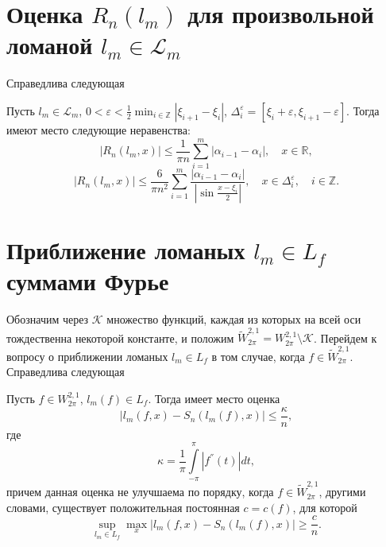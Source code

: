 \section{Оценка $R_n(l_m)$ для произвольной ломаной $l_m \in \mathcal{L}_m$}
Справедлива следующая
\begin{theorem}
Пусть $l_m \in \mathcal{L}_m$, $0 < \varepsilon < \frac{1}{2}\min_{i \in \mathbb{Z}} |\xi_{i+1} - \xi_i|$, $ \Delta_i^\varepsilon = [\xi_i + \varepsilon, \xi_{i+1} - \varepsilon]$. Тогда имеют место следующие неравенства:
\begin{equation}
|R_n(l_m,x)| \leq \frac{1}{\pi n} \sum\limits_{i=1}^{m} |\alpha_{i-1}-\alpha_i|, \quad x \in \mathbb{R}, \label{lm uniform estimate}
\end{equation}
\begin{equation}\label{lm non uniform estimate}
  |R_n(l_m,x)| \leq \frac{6}{\pi n^2} \sum\limits_{i=1}^{m} \frac{|\alpha_{i-1} - \alpha_i|}{\left|\sin \frac{x - \xi_i}{2}\right|}, \quad
  x \in \Delta_i^\varepsilon, \quad i \in \mathbb{Z}.
\end{equation}\label{th1}
\end{theorem}

\section{Приближение ломаных $l_m \in L_f$ суммами Фурье}
Обозначим через $\mathcal{K}$ множество функций, каждая из которых на всей оси тождественна некоторой константе, и положим
$\widetilde{W}_{2\pi}^{2,1} = W_{2\pi}^{2,1} \setminus \mathcal{K}$.
Перейдем к вопросу о приближении ломаных $l_m \in L_f$ в том случае, когда $f \in \widetilde{W}_{2\pi}^{2,1}$. Справедлива следующая
\begin{theorem}
  Пусть $f \in W_{2\pi}^{2,1}$, $l_m(f) \in L_f$. Тогда имеет место оценка
  \begin{equation}
    |l_m(f,x) - S_n(l_m(f),x)| \leq \frac{\kappa}{n},
  \end{equation}
  где
  \begin{equation}
    \kappa = \frac{1}{\pi} \int\limits_{-\pi}^{\pi} |f^{''}(t)|dt,
  \end{equation}
  причем данная оценка не улучшаема по порядку, когда $f \in \widetilde{W}_{2\pi}^{2,1}$, другими словами, существует положительная постоянная $c = c(f)$, для которой
  \begin{equation}
  \sup_{l_m \in L_f} \max_{x} |l_m(f,x) - S_n(l_m(f),x)| \geq \frac{c}{n}.
  \end{equation}
\end{theorem} 